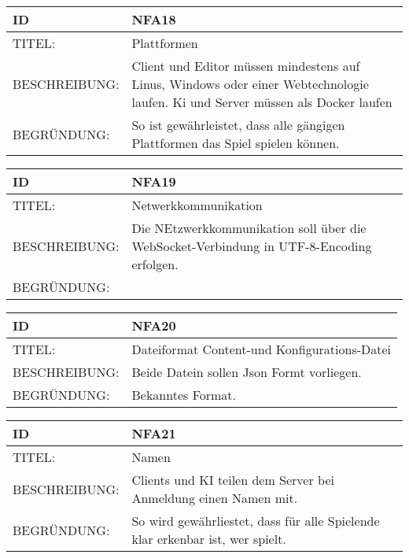 \documentclass{uulm-assignment}
\begin{document}
    \begin{tabularx}{\textwidth}{|l|X |} \hline
        \textbf{ID} & \textbf{NFA18} \\
        \hline
        TITEL: &  Plattformen\\
        \hline
        BESCHREIBUNG: &  Client und Editor müssen mindestens auf Linus, Windows oder einer Webtechnologie laufen.
        Ki und Server müssen als Docker laufen\\
        \hline
        BEGRÜNDUNG: &  So ist gewährleistet, dass alle gängigen Plattformen das Spiel spielen können.\\
        \hline
    \end{tabularx}

    \begin{tabularx}{\textwidth}{|l|X |} \hline
        \textbf{ID} & \textbf{NFA19} \\
        \hline
        TITEL: &  Netwerkkommunikation\\
        \hline
        BESCHREIBUNG: &  Die NEtzwerkkommunikation  soll über die WebSocket-Verbindung in UTF-8-Encoding erfolgen.\\
        \hline
        BEGRÜNDUNG: &  \\
        \hline
    \end{tabularx}

    \begin{tabularx}{\textwidth}{|l|X |} \hline
        \textbf{ID} & \textbf{NFA20} \\
        \hline
        TITEL: &  Dateiformat Content-und Konfigurations-Datei\\
        \hline
        BESCHREIBUNG: &  Beide Datein sollen Json Formt vorliegen.\\
        \hline
        BEGRÜNDUNG: &  Bekanntes Format.\\
        \hline
    \end{tabularx}

    \begin{tabularx}{\textwidth}{|l|X |} \hline
        \textbf{ID} & \textbf{NFA21} \\
        \hline
        TITEL: &  Namen\\
        \hline
        BESCHREIBUNG: &  Clients und KI teilen dem Server bei Anmeldung einen Namen mit.\\
        \hline
        BEGRÜNDUNG: &  So wird gewährliestet, dass für alle Spielende klar erkenbar ist, wer spielt.\\
        \hline
    \end{tabularx}
\end{document}
